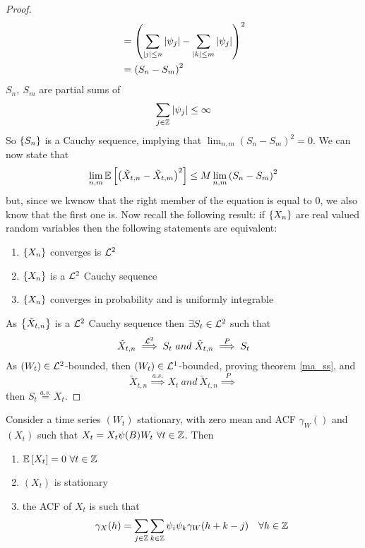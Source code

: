 \begin{proof}
\begin{equation*}
\begin{split}
            &=\left(\sum_{\left|j\right|\le n}\left|\psi_j\right|-\sum_{\left|k\right|\le m}\left|\psi_j\right|\right)^2\\
            &=\left(S_n-S_m\right)^2\\
        \end{split}
    \end{equation*}
    $S_n,\ S_m$ are partial sums of
    \[
        \sum_{j\in\mathbb{Z}}\left|\psi_j\right|\le\infty
    \]
    So $\left\{S_n\right\}$ is a Cauchy sequence, implying that $\lim_{n,m}\left(S_n-S_m\right)^2=0$. We can now state that
    \[
        \lim_{n,m}\mathbb{E}\left[\left(\tilde{X}_{t,n}-\tilde{X}_{t,m}\right)^2\right]\le M\lim_{n,m}\left(S_n-S_m\right)^2
    \]
    but, since we kwnow that the right member of the equation is equal to 0, we also know that the first one is. Now recall the following result: if $\left\{X_n\right\}$ are real valued random variables then the following statements are equivalent:
    \begin{enumerate}
        \item $\left\{X_n\right\}$ converges is $\mathcal{L}^{2}$
        \item $\left\{X_n\right\}$ is a $\mathcal{L}^{2}$ Cauchy sequence
        \item $\left\{X_n\right\}$ converges in probability and is uniformly integrable
    \end{enumerate}
    As $\left\{\tilde{X}_{t,n}\right\}$ is a $\mathcal{L}^{2}$ Cauchy sequence then $\exists S_t\in\mathcal{L}^{2}$ such that
    \[
        \tilde{X}_{t,n}\stackrel{\el{2}}{\implies}S_t\ and\ \tilde{X}_{t,n}\stackrel{P}{\implies}S_t
    \]
    As $(W_t)\in\mathcal{L}^{2}$-bounded, then $(W_t)\in\mathcal{L}^{1}$-bounded, proving theorem \ref{ma_ss}, and
    \[
        \tilde{X}_{t,n}\stackrel{a.s.}{\implies}X_t\ and\ \tilde{X}_{t,n}\stackrel{P}{\implies}  
    \]
    then $S_t\stackrel{a.s.}{=}X_t$.
\end{proof}

\begin{theorem}
    \label{theorem7}
    Consider a time series $(W_t)$ stationary, with zero mean and ACF $\gamma_W()$ and $(X_t)$ such that $X_t=X_t\psi(B)W_t\ \forall t\in\mathbb{Z}$. Then
    \begin{enumerate}
        \item $\mathbb{E}\left[X_t\right]=0\ \forall t\in\mathbb{Z}$
        \item $(X_t)$ is stationary
        \item the ACF of $X_t$ is such that 
            \[
                \gamma_X(h)=\sum_{j\in\Z}\sum_{k\in\Z}\psi_i\psi_k\gamma_W(h+k-j)\ \ \ \forall h\in\Z  
            \]
    \end{enumerate}
\end{theorem}

